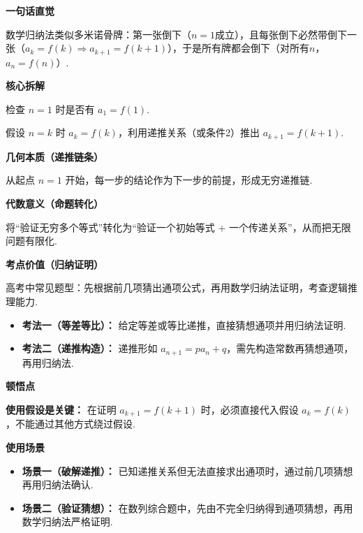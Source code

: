 \begin{explanationbox}
	\textbf{\textcolor{CExplanation}{一句话直觉}}

	数学归纳法类似多米诺骨牌：第一张倒下（$n=1$成立），且每张倒下必然带倒下一张（$a_k=f(k)\Rightarrow a_{k+1}=f(k+1)$），于是所有牌都会倒下（对所有$n$，$a_n=f(n)$）.

	\medskip
	\textbf{\textcolor{CExplanation}{核心拆解}}
	\begin{description}[style=nextline, leftmargin=2.8em, labelsep=0.5em, itemsep=0.45em]
		\item[\textbf{要点一（验证起点）：}] 检查 $n=1$ 时是否有 $a_1 = f(1)$.
		\item[\textbf{要点二（传递保持）：}] 假设 $n=k$ 时 $a_k=f(k)$，利用递推关系（或条件2）推出 $a_{k+1}=f(k+1)$.
	\end{description}

	\medskip
	\textbf{\textcolor{CExplanation}{几何本质（递推链条）}}

	从起点 $n=1$ 开始，每一步的结论作为下一步的前提，形成无穷递推链.

	\medskip
	\textbf{\textcolor{CExplanation}{代数意义（命题转化）}}

	将“验证无穷多个等式”转化为“验证一个初始等式 + 一个传递关系”，从而把无限问题有限化.

	\medskip
	\textbf{\textcolor{CExplanation}{考点价值（归纳证明）}}

	高考中常见题型：先根据前几项猜出通项公式，再用数学归纳法证明，考查逻辑推理能力.
	\begin{itemize}[leftmargin=*, itemsep=0.5em, topsep=0.4em]
		\item \textbf{考法一（等差等比）：} 给定等差或等比递推，直接猜想通项并用归纳法证明.
		\item \textbf{考法二（递推构造）：} 递推形如 $a_{n+1}=pa_n+q$，需先构造常数再猜想通项，再用归纳法.
	\end{itemize}

	\medskip
	\textbf{\textcolor{CExplanation}{顿悟点}}

	\textbf{使用假设是关键：} 在证明 $a_{k+1}=f(k+1)$ 时，必须直接代入假设 $a_k=f(k)$，不能通过其他方式绕过假设.

	\medskip
	\textbf{\textcolor{CExplanation}{使用场景}}
	\begin{itemize}[leftmargin=*, itemsep=0.5em, topsep=0.4em]
		\item \textbf{场景一（破解递推）：} 已知递推关系但无法直接求出通项时，通过前几项猜想再用归纳法确认.
		\item \textbf{场景二（验证猜想）：} 在数列综合题中，先由不完全归纳得到通项猜想，再用数学归纳法严格证明.
	\end{itemize}
\end{explanationbox}
